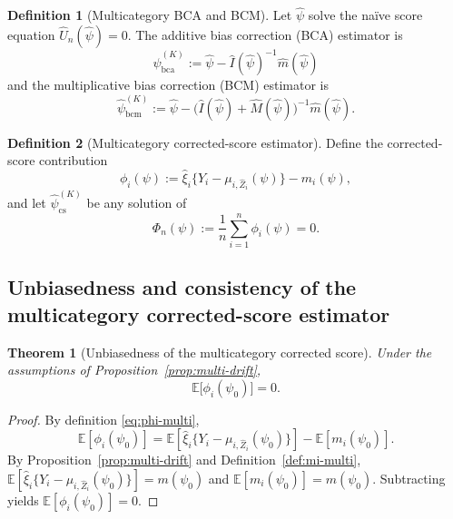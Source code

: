 \documentclass[11pt]{article}
\newtheorem{theorem}{Theorem}
\theoremstyle{definition}
\newtheorem{definition}{Definition}
\theoremstyle{remark}
\newcommand{\E}{\mathbb{E}}
\begin{document}
\begin{definition}[Multicategory BCA and BCM]\label{def:bca-bcm-multi}
Let $\hat\psi$ solve the na\"ive score equation $\hat U_n(\hat\psi)=0$.
The additive bias correction (BCA) estimator is
\begin{equation}
\hat\psi_{\mathrm{bca}}^{(K)}:=\hat\psi-\hat I(\hat\psi)^{-1}\hat m(\hat\psi)
\label{eq:bca-multi}
\end{equation}
and the multiplicative bias correction (BCM) estimator is
\begin{equation}
\hat\psi_{\mathrm{bcm}}^{(K)}:=\hat\psi-\big(\hat I(\hat\psi)+\hat M(\hat\psi)\big)^{-1}\hat m(\hat\psi).
\label{eq:bcm-multi}
\end{equation}
\end{definition}

\begin{definition}[Multicategory corrected-score estimator]\label{def:cs-multi}
Define the corrected-score contribution
\begin{equation}
\phi_i(\psi):=\hat\xi_i\Big\{Y_i-\mu_{i,\hat Z_i}(\psi)\Big\}-m_i(\psi),
\label{eq:phi-multi}
\end{equation}
and let $\hat\psi_{\mathrm{cs}}^{(K)}$ be any solution of
\begin{equation}
\Phi_n(\psi):=\frac{1}{n}\sum_{i=1}^n\phi_i(\psi)=0.
\label{eq:cs-multi}
\end{equation}
\end{definition}

\subsection{Unbiasedness and consistency of the multicategory corrected-score estimator}

\begin{theorem}[Unbiasedness of the multicategory corrected score]\label{thm:multi-cs-unbiased}
Under the assumptions of Proposition~\ref{prop:multi-drift},
\[
\E\big[\phi_i(\psi_0)\big]=0.
\]
\end{theorem}

\begin{proof}
By definition \eqref{eq:phi-multi},
\[
\E[\phi_i(\psi_0)]
=\E\!\left[\hat\xi_i\{Y_i-\mu_{i,\hat Z_i}(\psi_0)\}\right]-\E[m_i(\psi_0)].
\]
By Proposition~\ref{prop:multi-drift} and Definition~\ref{def:mi-multi},
$\E[\hat\xi_i\{Y_i-\mu_{i,\hat Z_i}(\psi_0)\}]=m(\psi_0)$ and $\E[m_i(\psi_0)]=m(\psi_0)$.
Subtracting yields $\E[\phi_i(\psi_0)]=0$.
\end{proof}
\end{document}
